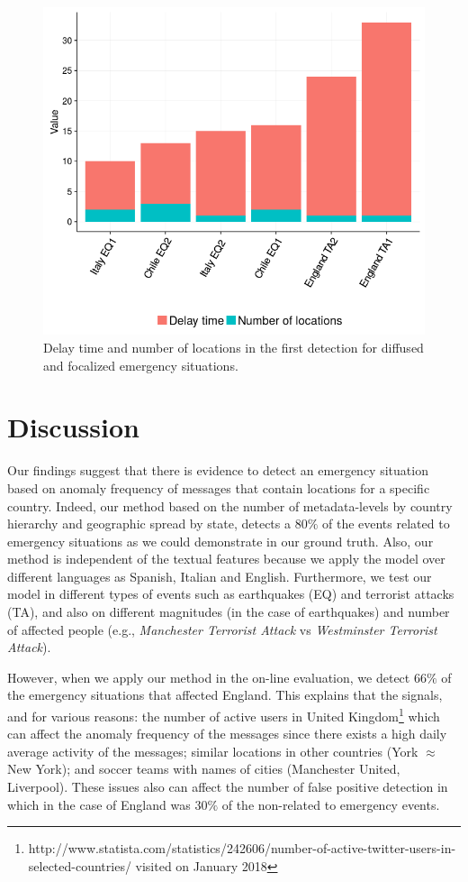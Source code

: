\documentclass[sigconf]{acmart}
\begin{document}
\begin{figure}
	\centering
	\includegraphics[width=\columnwidth]{img/delay.png}
	\caption{Delay time and number of locations in the first detection for diffused and focalized emergency situations.}
	\label{fig:delay}
\end{figure}

\section{Discussion}

Our findings suggest that there is evidence to detect an emergency situation based on anomaly frequency of messages that contain locations for a specific country. Indeed, our method based on the number of metadata-levels by country hierarchy and geographic spread by state, detects a $80\%$ of the events related to emergency situations as we could demonstrate in our ground truth. Also, our method is independent of the textual features because we apply the model over different languages as Spanish, Italian and English. Furthermore, we test our model in different types of events such as earthquakes (EQ) and terrorist attacks (TA), and also on different magnitudes (in the case of earthquakes) and number of affected people (e.g., \textit{Manchester Terrorist Attack} vs \textit{Westminster Terrorist Attack}).

However, when we apply our method in the on-line evaluation, we detect $66\%$ of the emergency situations that affected England. This explains that the signals, and for various reasons: the number of active users in United Kingdom\footnote{http://www.statista.com/statistics/242606/number-of-active-twitter-users-in-selected-countries/ visited on January 2018} which can affect the anomaly frequency of the messages since there exists a high daily average activity of the messages; similar locations in other countries (York $\approx$ New York); and soccer teams with names of cities (Manchester United, Liverpool). These issues also can affect the number of false positive detection in which in the case of England was $30\%$ of the non-related to emergency events.
\end{document}
